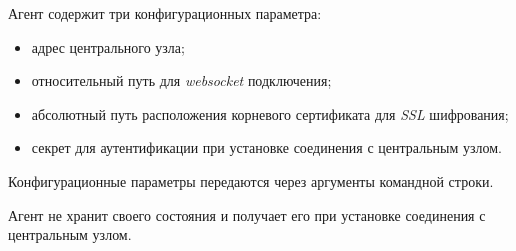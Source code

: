 Агент содержит три конфигурационных параметра:
\begin{itemize}
	\item адрес центрального узла;
	\item относительный путь для \textit{websocket} подключения;
	\item абсолютный путь расположения корневого сертификата для \textit{SSL} шифрования;
	\item секрет для аутентификации при установке соединения с центральным узлом.
\end{itemize}

Конфигурационные параметры передаются через аргументы командной строки.

Агент не хранит своего состояния и получает его при установке соединения с центральным узлом.